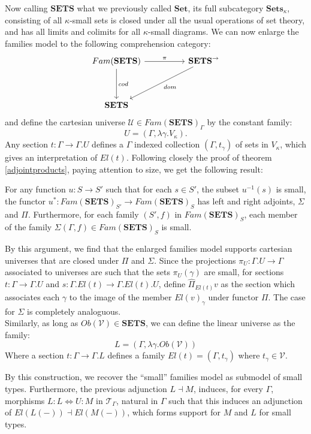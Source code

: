 Now calling $\mathbf{SETS}$ what we previously called $\mathbf{Set}$, its full subcategory $\mathbf{Sets}_\kappa$, consisting of all $\kappa$-small sets is closed under all the usual operations of set theory, and has all limits and colimits for all $\kappa$-small diagrams. We can now enlarge the families model to the following comprehension category:
\[
  \ti
  Fam(\mathbf{SETS}) \ar[r, "\pi"] \ar[d, "cod"] & \mathbf{SETS}^\to \ar[ld, "dom"]\\
  \mathbf{SETS}
  \kz
\]
and define the cartesian universe $\mathcal{U} \in Fam(\mathbf{SETS})_\Gamma$ by the constant family:
\[
U = (\Gamma, \lambda \gamma. V_\kappa).
\]
Any section $t : \Gamma \to \Gamma.U$ defines a $\Gamma$ indexed collection $(\Gamma, t_\gamma)$ of sets in $V_\kappa$, which gives an interpretation of $El(t)$. Following closely the proof of theorem \ref{adjointproducts}, paying attention to size, we get the following result:
\begin{corl}
  For any function $u : S \to S'$  such that for each $s \in S'$, the subset $u^{-1}(s)$ is small, the functor  $u^* : Fam(\mathbf{SETS})_{S'} \to Fam(\mathbf{SETS})_S$ has left and right adjoints, $\Sigma$ and $\Pi$. Furthermore, for each family $(S', f)$ in $Fam(\mathbf{SETS})_S$, each member of the family $\Sigma(\Gamma, f) \in Fam(\mathbf{SETS})_S$ is small.
\end{corl}
By this argument, we find that the enlarged families model supports cartesian universes that are closed under $\Pi$ and $\Sigma$. Since the projections $\pi_U : \Gamma.U \to \Gamma$ associated to universes are such that the sets $\pi_U(\gamma)$ are small, for sections $t : \Gamma \to \Gamma.U$ and $s : \Gamma.El(t) \to \Gamma.El(t).U$, define $\hat \Pi_{El(t)}v$ as the section which associates each $\gamma$ to the image of the member $El(v)_\gamma$ under functor $\Pi$. The case for $\Sigma$ is completely analoguous.\\
Similarly, as long as $Ob(\mathcal{V}) \in \mathbf{SETS}$, we can define the linear universe as the family:
\[
  L = (\Gamma, \lambda \gamma. Ob(\mathcal{V}))
\]
Where a section $t : \Gamma \to \Gamma.L$ defines a family $El(t) = (\Gamma, t_\gamma)$ where $t_\gamma \in \mathcal{V}$.

By this construction, we recover the ``small'' families model as submodel of small types. Furthermore, the previous adjunction $L \dashv M$, induces, for every $\Gamma$, morphisms $L : L \iff U : M$ in $\mathcal{T}_{\Gamma}$, natural in $\Gamma$ such that this induces an adjunction of $El(L(-)) \dashv El(M(-))$, which forms support for $M$ and $L$ for small types.
